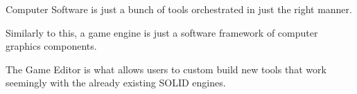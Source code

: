 

Computer Software is just a bunch of tools orchestrated in just the right manner.


Similarly to this, a game engine is just a software framework of computer graphics components.


The Game Editor is what allows users to custom build new tools that work seemingly with the already existing SOLID engines.


